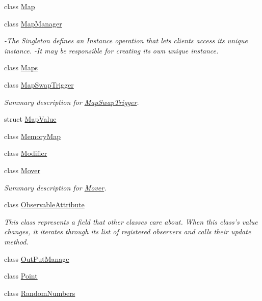\begin{DoxyCompactItemize}
class \hyperlink{class_p_a_z___dispersal_1_1_map}{Map}
\item 
class \hyperlink{class_p_a_z___dispersal_1_1_map_manager}{Map\-Manager}
\begin{DoxyCompactList}\small\item\em -\/\-The Singleton defines an Instance operation that lets clients access its unique instance. -\/\-It may be responsible for creating its own unique instance. \end{DoxyCompactList}\item 
class \hyperlink{class_p_a_z___dispersal_1_1_maps}{Maps}
\item 
class \hyperlink{class_p_a_z___dispersal_1_1_map_swap_trigger}{Map\-Swap\-Trigger}
\begin{DoxyCompactList}\small\item\em Summary description for \hyperlink{class_p_a_z___dispersal_1_1_map_swap_trigger}{Map\-Swap\-Trigger}. \end{DoxyCompactList}\item 
struct \hyperlink{struct_p_a_z___dispersal_1_1_map_value}{Map\-Value}
\item 
class \hyperlink{class_p_a_z___dispersal_1_1_memory_map}{Memory\-Map}
\item 
class \hyperlink{class_p_a_z___dispersal_1_1_modifier}{Modifier}
\item 
class \hyperlink{class_p_a_z___dispersal_1_1_mover}{Mover}
\begin{DoxyCompactList}\small\item\em Summary description for \hyperlink{class_p_a_z___dispersal_1_1_mover}{Mover}. \end{DoxyCompactList}\item 
class \hyperlink{class_p_a_z___dispersal_1_1_observable_attribute}{Observable\-Attribute}
\begin{DoxyCompactList}\small\item\em This class represents a field that other classes care about. When this class's value changes, it iterates through its list of registered observers and calls their update method. \end{DoxyCompactList}\item 
class \hyperlink{class_p_a_z___dispersal_1_1_out_put_manage}{Out\-Put\-Manage}
\item 
class \hyperlink{class_p_a_z___dispersal_1_1_point}{Point}
\item 
class \hyperlink{class_p_a_z___dispersal_1_1_random_numbers}{Random\-Numbers}
\item 

\end{DoxyCompactItemize}
